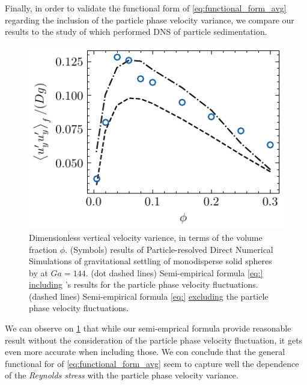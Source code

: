 Finally, in order to validate the functional form of \ref{eq:functional_form_avg} regarding the inclusion of the particle phase velocity variance, we compare our results to the study of \citet{shajahan2023inertial} which performed DNS of particle sedimentation.  
\begin{figure}
    \centering
    \includegraphics[height = 0.25\textwidth]{image/HOMOGENEOUS_final/CA/tariq.pdf}
    \caption{Dimensionless vertical velocity varience, in terms of the volume fraction $\phi$. 
    (Symbols) results of Particle-resolved Direct Numerical Simulations  of gravitational settling of monodisperse solid spheres by \citet{shajahan2023inertial} at $Ga = 144$. 
    (dot dashed lines) Semi-empirical formula \ref{eq:} \underline{including} \citet{shajahan2023inertial}'s results for the particle phase velocity fluctuations. 
    (dashed lines) Semi-empirical formula \ref{eq:} \underline{excluding} the particle phase velocity fluctuations. 
    }
    \label{fig:tariq}
\end{figure}
We can observe on \ref{fig:tariq} that while our semi-emprical formula provide reasonable result without the consideration of the particle phase velocity fluctuation, it gets even more accurate when including those. 
We con conclude that the general functional for of \ref{eq:functional_form_avg} seem to capture well the dependence of the \textit{Reynolds stress} with the particle phase velocity variance. 
